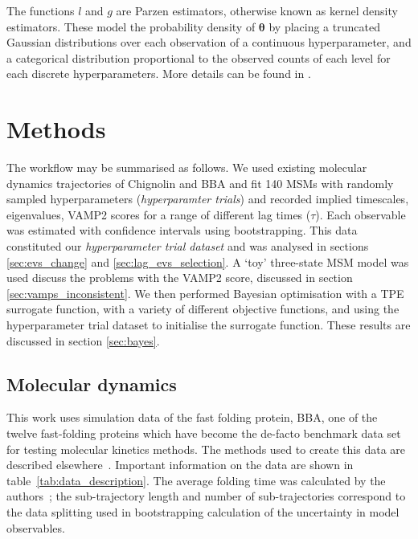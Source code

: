 \documentclass[journal=jacsat,manuscript=article]{achemso}
\begin{document}
The functions $l$ and $g$ are Parzen estimators, otherwise known as kernel density estimators.  These model the probability density of $\bm{\theta}$ by placing a truncated Gaussian distributions over each observation of a continuous hyperparameter, and a categorical distribution proportional to the observed counts of each level for each discrete hyperparameters. More details can be found in \cite{bergstraAlgorithmsHyperParameterOptimizationa, bergstraMakingScienceModel2013}. 



\section{Methods}

The workflow may be summarised as follows.  We used existing molecular dynamics trajectories of Chignolin and BBA and fit 140 MSMs with randomly sampled hyperparameters (\emph{hyperparamter trials}) and recorded implied timescales, eigenvalues, VAMP2 scores for a range of different lag times ($\tau$). Each observable was estimated with confidence intervals using bootstrapping. This data constituted our \emph{hyperparameter trial dataset} and was analysed in sections \ref{sec:evs_change} and \ref{sec:lag_evs_selection}. A `toy' three-state MSM model was used discuss the problems with the VAMP2 score, discussed in section \ref{sec:vamps_inconsistent}. We then performed Bayesian optimisation with a TPE surrogate function, with a variety of different objective functions, and using the hyperparameter trial dataset to initialise the surrogate function. These results are discussed in  section \ref{sec:bayes}. 




\subsection{Molecular dynamics}

This work uses simulation data of the fast folding protein, BBA, one of the twelve fast-folding proteins which have become the de-facto benchmark data set for testing molecular kinetics methods. The methods used to create this data are described elsewhere~\cite{lindorff-larsen_how_2011}. Important information on the data are shown in table~\ref{tab:data_description}. The average folding time was calculated by the authors~\cite{lindorff-larsen_how_2011}; the sub-trajectory length and number of sub-trajectories correspond to the data splitting used in bootstrapping calculation of the uncertainty in model observables.
\end{document}
